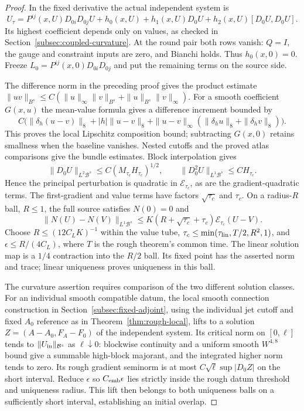\documentclass[11pt]{article}
\numberwithin{equation}{section}
\theoremstyle{definition}
\theoremstyle{remark}
\begin{document}
\begin{proof}
In the fixed derivative the actual independent system is
\[
 U_\tau=P^{ij}(x,U)D_{0i}D_{0j}U+h_0(x,U)
       +h_1(x,U)D_0U+h_2(x,U)[D_0U,D_0U].
\]
Its highest coefficient depends only on values, as
checked in Section~\ref{subsec:coupled-curvature}.
At the round pair both rows vanish: $Q=I$, the
gauge and constraint inputs are zero, and Bianchi
holds. Thus $h_0(x,0)=0$.
Freeze $L_0=P^{ij}(x,0)D_{0i}D_{0j}$ and put the
remaining terms on the source side.

The difference norm in the preceding proof gives the
product estimate
$\|uv\|_{B^s}\le C(\|u\|_\infty\|v\|_{B^s}
+\|u\|_{B^s}\|v\|_\infty)$.
For a smooth coefficient $G(x,u)$ the mean-value
formula gives a difference increment bounded by
\[
 C\bigl(\|\delta_h(u-v)\|_8+|h|\|u-v\|_8
   +\|u-v\|_\infty(\|\delta_hu\|_8+\|\delta_hv\|_8)\bigr).
\]
This proves the local Lipschitz composition bound;
subtracting $G(x,0)$ retains smallness when the
baseline vanishes. Nested cutoffs and the proved
atlas comparisons give the bundle estimates.
Block interpolation gives
\[
 \|D_0U\|_{L^2\mathcal B^s}
       \le C(M_{\tau_c}H_{\tau_c})^{1/2},
 \qquad
 \|D_0^2U\|_{L^1\mathcal B^s}\le CH_{\tau_c}.
\]
Hence the principal perturbation is quadratic in
$\mathcal E_{\tau_c}$, as are the gradient-quadratic
terms. The first-gradient and value terms have
factors $\sqrt{\tau_c}$ and $\tau_c$.
On a radius-$R$ ball, $R\le1$, the full source
satisfies $N(0)=0$ and
\[
 \|N(U)-N(V)\|_{L^1\mathcal B^s}
 \le K(R+\sqrt{\tau_c}+\tau_c)\mathcal E_{\tau_c}(U-V).
\]
Choose $R\le(12C_LK)^{-1}$ within the value tube,
$\tau_c\le\min(\tau_{\rm lin},T/2,R^2,1)$,
and $\epsilon\le R/(4C_L)$, where $T$ is the
rough theorem's common time. The linear solution map
is a $1/4$ contraction into the $R/2$ ball.
Its fixed point has the asserted norm and trace;
linear uniqueness proves uniqueness in this ball.

The curvature assertion requires comparison of the
two different solution classes. For an individual
smooth compatible datum, the local smooth connection
construction in Section~\ref{subsec:fixed-adjoint},
using the individual jet cutoff and fixed $A_0$
reference as in Theorem~\ref{thm:rough-local},
lifts to a solution $Z=(A-A_0,F_A-F_0)$ of the
independent system. Its critical norm on $[0,\ell]$
tends to $\|U_{\rm in}\|_{\mathcal B^s}$ as
$\ell\downarrow0$: blockwise continuity and a
uniform smooth $W^{4,8}$ bound give a summable
high-block majorant, and the integrated higher norm
tends to zero. Its rough gradient seminorm is at most
$C\sqrt\ell\sup|D_0Z|$ on the short interval.
Reduce $\epsilon$ so $C_{\rm emb}\epsilon$ lies strictly
inside the rough datum threshold and uniqueness radius.
This lift then belongs to both uniqueness
balls on a sufficiently short interval, establishing
an initial overlap.


\end{proof}
\end{document}
